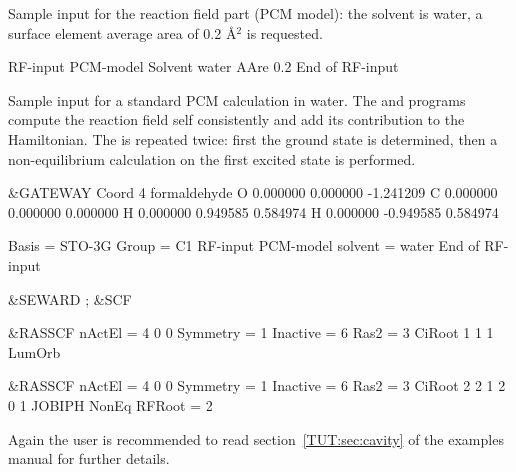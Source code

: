 Sample input for the reaction field part (PCM model): the solvent is
water, a surface element average area of 0.2 \AA$^2$ is requested.

\begin{inputlisting}
RF-input
PCM-model
Solvent
water
AAre
0.2
End of RF-input

\end{inputlisting}

Sample input for a standard PCM calculation in water.
The  and  programs compute the reaction field
self consistently and add its contribution to the Hamiltonian. The  is
repeated twice: first the ground state is determined, then a non-equilibrium
calculation on the first excited state is performed.

\begin{inputlisting}
 &GATEWAY
Coord
4
formaldehyde
O 0.000000 0.000000 -1.241209
C 0.000000 0.000000 0.000000
H 0.000000 0.949585 0.584974
H 0.000000 -0.949585 0.584974

Basis = STO-3G
Group = C1
RF-input
PCM-model
solvent = water
End of RF-input

 &SEWARD ;  &SCF

 &RASSCF
nActEl   = 4 0 0
Symmetry = 1
Inactive = 6
Ras2     = 3
CiRoot
1 1
1
LumOrb

 &RASSCF
nActEl   = 4 0 0
Symmetry = 1
Inactive = 6
Ras2     = 3
CiRoot
2 2
1 2
0 1
JOBIPH
NonEq
RFRoot  = 2
\end{inputlisting}
%
%
Again the user is recommended to read section~\ref{TUT:sec:cavity} of the
examples manual for further details.


